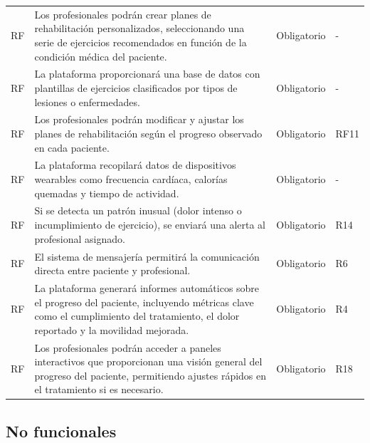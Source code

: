 \documentclass{article}
\begin{document}
\begin{longtable}{@{} p{2.5cm} p{6.5cm} p{3cm} p{3cm} @{}}
	RF\therequisitosFuncionales & Los profesionales podrán crear planes de rehabilitación personalizados, seleccionando una serie de ejercicios recomendados en función de la condición médica del paciente. & Obligatorio & - \\ 
	\addlinespace \stepcounter{requisitosFuncionales}

	RF\therequisitosFuncionales & La plataforma proporcionará una base de datos con plantillas de ejercicios clasificados por tipos de lesiones o enfermedades. & Obligatorio & - \\ 
	\addlinespace \stepcounter{requisitosFuncionales}

	RF\therequisitosFuncionales & Los profesionales podrán modificar y ajustar los planes de rehabilitación según el progreso observado en cada paciente. & Obligatorio & RF11 \\ 
	\addlinespace \stepcounter{requisitosFuncionales}
	RF\therequisitosFuncionales & La plataforma recopilará datos de dispositivos wearables como frecuencia cardíaca, calorías quemadas y tiempo de actividad. & Obligatorio & - \\
	\addlinespace \stepcounter{requisitosFuncionales}
	RF\therequisitosFuncionales & Si se detecta un patrón inusual (dolor intenso o incumplimiento de ejercicio), se enviará una alerta al profesional asignado. & Obligatorio & R14 \\
	\addlinespace \stepcounter{requisitosFuncionales}
	RF\therequisitosFuncionales & El sistema de mensajería permitirá la comunicación directa entre paciente y profesional. & Obligatorio & R6 \\
	\addlinespace \stepcounter{requisitosFuncionales}
	RF\therequisitosFuncionales & La plataforma generará informes automáticos sobre el progreso del paciente, incluyendo métricas clave como el cumplimiento del tratamiento, el dolor reportado y la movilidad mejorada. & Obligatorio & R4 \\
	\addlinespace \stepcounter{requisitosFuncionales}
	RF\therequisitosFuncionales & Los profesionales podrán acceder a paneles interactivos que proporcionan una visión general del progreso del paciente, permitiendo ajustes rápidos en el tratamiento si es necesario. & Obligatorio & R18 \\
	\bottomrule
\end{longtable}



\subsection{No funcionales}
\end{document}
